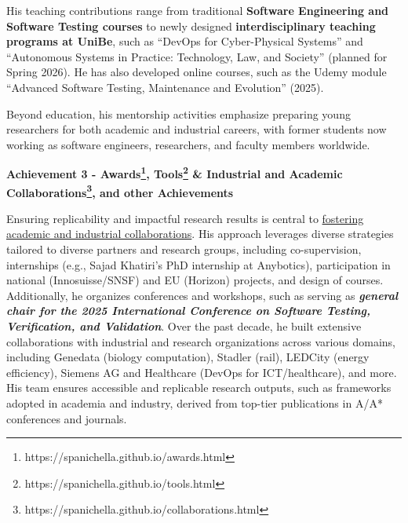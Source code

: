 \documentclass[11pt]{article}
\begin{document}
\begin{itemize}
His teaching contributions range from traditional \textbf{Software Engineering and Software Testing courses} to newly designed \textbf{interdisciplinary teaching programs at UniBe}, such as “DevOps for Cyber-Physical Systems” and “Autonomous Systems in Practice: Technology, Law, and Society” (planned for Spring 2026). He has also developed online courses, such as the Udemy module “Advanced Software Testing, Maintenance and Evolution” (2025).

Beyond education, his mentorship activities emphasize preparing young researchers for both academic and industrial careers, with former students now working as software engineers, researchers, and faculty members worldwide.

  
  \vspace{-2mm} 

\end{itemize}


\noindent \textbf{Achievement 3 - Awards\footnote{https://spanichella.github.io/awards.html}, Tools\footnote{https://spanichella.github.io/tools.html} \& Industrial and Academic Collaborations\footnote{https://spanichella.github.io/collaborations.html}, and other Achievements} 

Ensuring replicability and impactful research results is central to \href{https://spanichella.github.io/collaborations.html}{fostering academic and industrial collaborations}. His approach leverages diverse strategies tailored to diverse partners and research groups, including co-supervision, internships (e.g., Sajad Khatiri's PhD internship at Anybotics), participation in national (Innosuisse/SNSF) and EU (Horizon) projects, and design of courses. Additionally, he organizes conferences and workshops, such as serving as \textit{\textbf{general chair for the 2025 International Conference on Software Testing, Verification, and Validation}}. 
Over the past decade, he built extensive collaborations with industrial and research organizations across various domains, including Genedata (biology computation), Stadler (rail), LEDCity (energy efficiency), Siemens AG and Healthcare (DevOps for ICT/healthcare), and more. His team ensures accessible and replicable research outputs, such as frameworks adopted in academia and industry, derived from top-tier publications in A/A* conferences and journals. 
\end{document}
